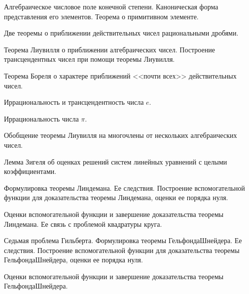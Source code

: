 \documentclass[a4paper,draft]{article}
\begin{document}
\begin{nums}{0}
\item Алгебраическое числовое поле конечной степени. Каноническая
форма представления его элементов. Теорема о примитивном элементе.

\item Две теоремы о приближении действительных чисел рациональными
дробями.

\item Теорема Лиувилля о приближении алгебраических чисел.
Построение трансцендентных чисел при помощи теоремы Лиувилля.

\item Теорема Бореля о характере приближений <<почти всех>> действительных чисел.

\item Иррациональность и трансцендентность числа   $e$.

\item Иррациональность  числа   $\pi$.

\item Обобщение теоремы Лиувилля на многочлены от нескольких
алгебраических чисел.

\item Лемма Зигеля об оценках решений систем линейных уравнений с
целыми коэффициентами.

\item Формулировка теоремы Линдемана. Ее следствия. Построение
вспомогательной функции для доказательства теоремы Линдемана, оценки ее порядка нуля.

\item Оценки вспомогательной функции и завершение доказательства
теоремы Линдемана. Ее связь с проблемой квадратуры круга.

\item Седьмая проблема Гильберта. Формулировка теоремы
Гельфонда\ч Шнейдера. Ее следствия. Построение
вспомогательной функции для доказательства теоремы
Гельфонда\ч Шнейдера, оценки ее порядка нуля.

\item Оценки вспомогательной функции и завершение доказательства
теоремы Гельфонда\ч Шнейдера.
\end{nums}

\medskip
\dmvntrail
\end{document}
